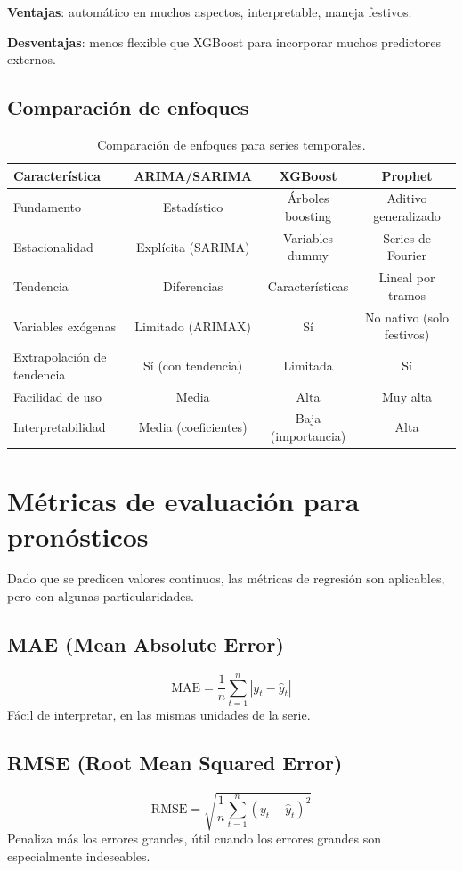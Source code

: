 \documentclass[12pt,a4paper,openany,oneside]{book}
\begin{document}
\textbf{Ventajas}: automático en muchos aspectos, interpretable, maneja festivos.

\textbf{Desventajas}: menos flexible que XGBoost para incorporar muchos predictores externos.

\subsection{Comparación de enfoques}
\begin{table}[h]
\centering
\begin{tabular}{|l|c|c|c|}
\hline
\textbf{Característica} & \textbf{ARIMA/SARIMA} & \textbf{XGBoost} & \textbf{Prophet} \\
\hline
Fundamento & Estadístico & Árboles boosting & Aditivo generalizado \\
Estacionalidad & Explícita (SARIMA) & Variables dummy & Series de Fourier \\
Tendencia & Diferencias & Características & Lineal por tramos \\
Variables exógenas & Limitado (ARIMAX) & Sí & No nativo (solo festivos) \\
Extrapolación de tendencia & Sí (con tendencia) & Limitada & Sí \\
Facilidad de uso & Media & Alta & Muy alta \\
Interpretabilidad & Media (coeficientes) & Baja (importancia) & Alta \\
\hline
\end{tabular}
\caption{Comparación de enfoques para series temporales.}
\end{table}

\section{Métricas de evaluación para pronósticos}

Dado que se predicen valores continuos, las métricas de regresión son aplicables, pero con algunas particularidades.

\subsection{MAE (Mean Absolute Error)}
\[
\text{MAE} = \frac{1}{n} \sum_{t=1}^n |y_t - \hat{y}_t|
\]
Fácil de interpretar, en las mismas unidades de la serie.

\subsection{RMSE (Root Mean Squared Error)}
\[
\text{RMSE} = \sqrt{\frac{1}{n} \sum_{t=1}^n (y_t - \hat{y}_t)^2}
\]
Penaliza más los errores grandes, útil cuando los errores grandes son especialmente indeseables.
\end{document}
